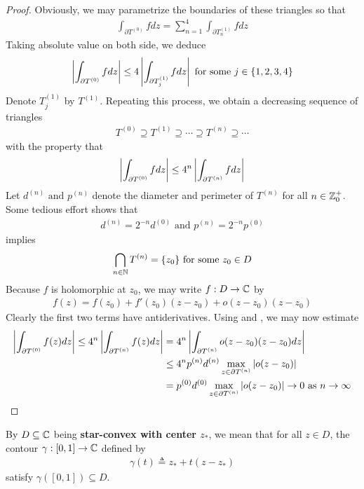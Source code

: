 \documentclass{report}
\begin{document}
\begin{proof}
Obviously, we may parametrize the boundaries of these triangles so that 
\begin{align*}
\int_{ \partial T^{(0)}}fdz= \sum_{n=1}^4 \int_{\partial T^{(1)}_n} fdz
\end{align*}
Taking absolute value on both side, we deduce 
\begin{align*}
  \left|\int_{\partial  T^{(0)}}fdz \right|\leq 4 \left|\int_{\partial  T^{(1)}_j}fdz\right|\text{ for some $j \in \{ 1,2,3,4 \}$}
\end{align*}
Denote $T_j^{(1)}$ by $T^{(1)}$. Repeating this process, we obtain a decreasing sequence of triangles 
\begin{align*}
T^{(0)} \supseteq T^{(1)} \supseteq \cdots \supseteq T^{(n)} \supseteq \cdots 
\end{align*} 
with the property that
\begin{align}
\label{pe1}
\left|\int_{\partial  T^{(0)}}fdz\right|\leq 4^n \left|\int_{\partial T^{(n)}}fdz\right|
\end{align}
Let $d^{(n)}\text{ and }p^{(n)}$ denote the diameter and perimeter of $T^{(n)}$ for all $n\in\mathbb{Z}_0^+$. Some tedious effort shows that 
\begin{align}
\label{pe2}
d^{(n)}=2^{-n}d^{(0)}\text{ and }p^{(n)}=2^{-n}p^{(0)}
\end{align}
 implies 
\begin{align*}
\bigcap_{n\in\mathbb{N}} T^{(n)}=\{ z_0 \}\text{ for some }z_0 \in D
\end{align*}
Because $f$ is holomorphic at  $z_0$, we may write $f:D\rightarrow \mathbb{C}$ by 
\begin{align*}
f(z)=f(z_0)+f'(z_0)(z-z_0)+o(z-z_0)(z-z_0)
\end{align*}
Clearly the first two terms have antiderivatives. Using  and , we may now estimate 
\begin{align*}
 \left|\int_{\partial T^{(0)}}f(z)dz\right|\leq  4^n\left|\int_{\partial T^{(n)}} f(z)dz\right|&= 4^n\left|\int_{\partial  T^{(n)}} o(z-z_0)(z-z_0)dz\right|\\
  &\leq 4^np^{(n)}d^{(n)}\max_{ z\in \partial T^{(n)}}\left|o(z-z_0)\right|\\
  &= p^{(0)}d^{(0)} \max_{z \in \partial T^{(n)}} \left|o(z-z_0)\right|\to 0\text{ as }n\to \infty
\end{align*}
\end{proof}
\begin{mdframed}
By $D\subseteq \mathbb{C}$ being \textbf{star-convex with center $z_*$}, we mean that for all $z \in D$, the contour $\gamma :[0,1]\rightarrow \mathbb{C}$ defined by 
\begin{align*}
\gamma (t)\triangleq z_*+t(z-z_*)
\end{align*}
satisfy $\gamma ([0,1])\subseteq D$. 
\end{mdframed}
\end{document}
